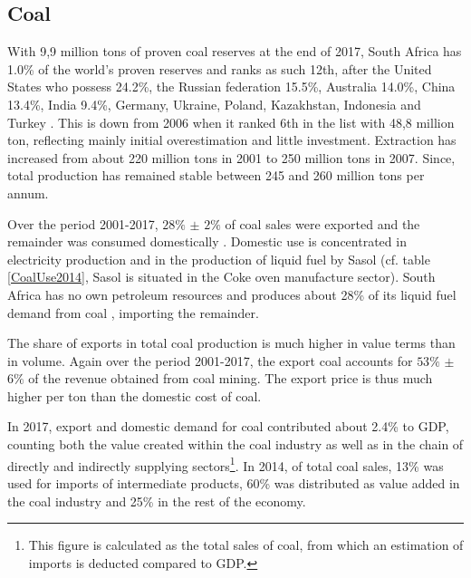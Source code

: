 \documentclass[12pt,english]{article}
\begin{document}
\subsection{Coal}

With 9,9 million tons of proven coal reserves at the end of 2017, South Africa has 1.0\% of the world's proven reserves and ranks as such 12th, after the United States who possess 24.2\%, the Russian federation 15.5\%, Australia 14.0\%, China 13.4\%, India 9.4\%, Germany, Ukraine, Poland, Kazakhstan, Indonesia and Turkey . %
This is down from 2006 when it ranked 6th in the list with 48,8 million ton, reflecting mainly initial overestimation and little investment. Extraction has increased from about 220 million tons in 2001 to 250 million tons in 2007. Since, total production has remained stable between 245 and 260 million tons per annum.  %

Over the period 2001-2017, $28\%$ $\pm$ $2\%$ of coal sales were exported and the remainder was consumed domestically . Domestic use is concentrated in electricity production and in the production of liquid fuel by Sasol (cf. table \ref{CoalUse2014}, Sasol is situated in the Coke oven manufacture sector). South Africa has no own petroleum resources and produces about 28\% of its liquid fuel demand from coal \citep{coal2013DoE}, importing the remainder. 

The share of exports in total coal production is much higher in value terms than in volume. Again over the period 2001-2017, the export coal accounts for $53\%$ $\pm$ $6\%$ of the revenue obtained from coal mining. The export price is thus much higher per ton than the domestic cost of coal.

In 2017, export and domestic demand for coal contributed about 2.4\% to GDP, counting both the value created within the coal industry as well as in the chain of directly and indirectly supplying sectors\footnote{This figure is calculated as the total sales of coal, from which an estimation of imports is deducted compared to GDP.}. In 2014, of total coal sales, 13\% was used for imports of intermediate products, 60\% was distributed as value added in the coal industry and 25\% in the rest of the economy.
\end{document}
